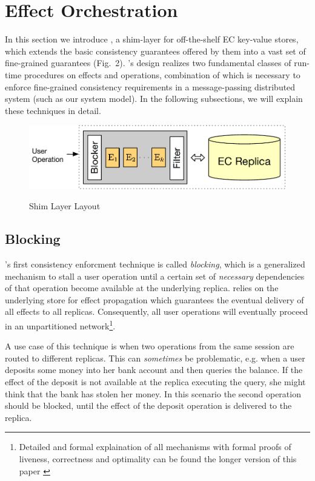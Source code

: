 \documentclass[authorversion]{sig-alternate-05-2015}
\begin{document}
\section{Effect Orchestration}
In this section we introduce \tool, a shim-layer for off-the-shelf EC key-value stores, 
which extends the basic consistency guarantees offered by them into a vast set of 
fine-grained guarantees (Fig.~2).
\tool's design realizes two fundamental classes of run-time procedures on effects and operations, 
combination of which is necessary to enforce fine-grained consistency requirements in a message-passing distributed system (such as our system model). In the following subsections, we will explain these techniques in detail.
\begin{figure}[h]
\centering
\includegraphics[scale=0.5]{Figures/shimlayer.pdf}
\label{fig:shim}
\caption{Shim Layer Layout}
\end{figure}

\subsection{Blocking}
\tool's first consistency enforcment technique is called \emph{blocking},
which is a generalized mechanism to stall a user operation until a certain set 
of \emph{necessary} dependencies of that operation become available at the underlying replica. 
\tool\; relies on the underlying store for effect propagation which guarantees the eventual delivery of all 
effects to all replicas. Consequently, all user operations will eventually proceed in an unpartitioned 
network\footnote{Detailed and formal explaination of all mechanisms with formal proofs of 
liveness, correctness and optimality can be found the longer version of this paper \cite{syncope}}. 

A use case of this technique is when two operations from the same session are routed to different replicas.
This can \emph{sometimes} be problematic, e.g. when a user deposits some money into her bank account and then queries the 
balance. If the effect of the deposit is not available at the replica executing the query, 
she might think that the bank has stolen her money.
In this scenario the second operation should be blocked, 
until the effect of the deposit operation is delivered to the replica. 
\end{document}
